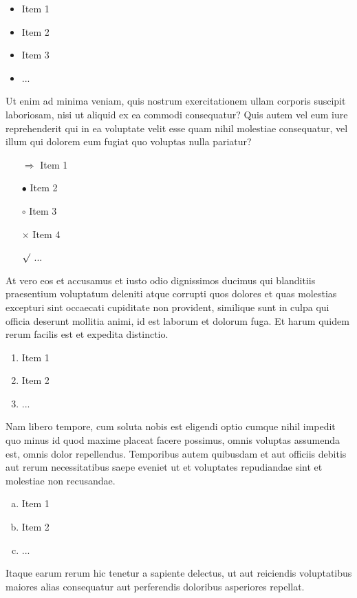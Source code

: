 \begin{itemize}
	\item Item 1
	\item Item 2
	\item Item 3
	\item ...
\end{itemize}


Ut enim ad minima veniam, quis nostrum exercitationem ullam corporis suscipit laboriosam, nisi ut aliquid ex ea commodi consequatur? Quis autem vel eum iure reprehenderit qui in ea voluptate velit esse quam nihil molestiae consequatur, vel illum qui dolorem eum fugiat quo voluptas nulla pariatur?

\begin{itemize}
	\item[$\Rightarrow$] Item 1
	\item[$\bullet$] Item 2
	\item[$\circ$] Item 3
	\item[$\times$] Item 4
	\item[$\surd$] ...
\end{itemize}

At vero eos et accusamus et iusto odio dignissimos ducimus qui blanditiis praesentium voluptatum deleniti atque corrupti quos dolores et quas molestias excepturi sint occaecati cupiditate non provident, similique sunt in culpa qui officia deserunt mollitia animi, id est laborum et dolorum fuga. Et harum quidem rerum facilis est et expedita distinctio. 

\begin{enumerate}
	\item Item 1
	\item Item 2
	\item ...
\end{enumerate}

Nam libero tempore, cum soluta nobis est eligendi optio cumque nihil impedit quo minus id quod maxime placeat facere possimus, omnis voluptas assumenda est, omnis dolor repellendus. Temporibus autem quibusdam et aut officiis debitis aut rerum necessitatibus saepe eveniet ut et voluptates repudiandae sint et molestiae non recusandae. 

\begin{enumerate}[a)]
	\item Item 1
	\item Item 2
	\item ...
\end{enumerate}

Itaque earum rerum hic tenetur a sapiente delectus, ut aut reiciendis voluptatibus maiores alias consequatur aut perferendis doloribus asperiores repellat.

